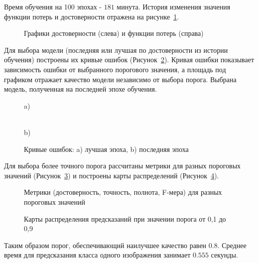 Время обучения на 100 эпохах - $181$ минута. История изменения значения функции потерь и достоверности отражена на рисунке~\ref{cp50-loss}. 

\begin{figure}[H]
	\caption{Графики достоверности (слева) и функции потерь (справа)} 
	\label{cp50-loss} 
\end{figure}

Для выбора модели (последняя или лучшая по достоверности из истории обучения) построены их кривые ошибок (Рисунок~\ref{cp50-roc}). Кривая ошибки показывает зависимость ошибки от выбранного порогового значения, а площадь под графиком отражает качество модели независимо от выбора порога. Выбрана модель, полученная на последней эпохе обучения.

\begin{figure}[H]
	\begin{minipage}[h]{0.49\linewidth}
		 a) \\
	\end{minipage}
	\hfill
	\begin{minipage}[h]{0.49\linewidth}
		 \\b)
	\end{minipage}
	\caption{Кривые ошибок: a) лучшая эпоха, b)
		последняя эпоха}
	\label{cp50-roc}
\end{figure}

Для выбора более точного порога рассчитаны метрики для разных пороговых значений (Рисунок~\ref{cp50-p}) и построены карты распределений (Рисунок~\ref{cp50-maps}). 

\begin{figure}[H]
	\center{\texttt{[image: cp50-p100]}} 
	\caption{Метрики (достоверность, точность, полнота, F-мера) для разных пороговых значений}
	\label{cp50-p}
\end{figure}

\begin{figure}[H]
	\caption{Карты распределения предсказаний при значении порога от 0,1 до 0,9}
	\label{cp50-maps}
\end{figure}

Таким образом порог, обеспечивающий наилучшее качество равен $0.8$.  Среднее время для предсказания класса одного изображения занимает $0.555$ секунды.

